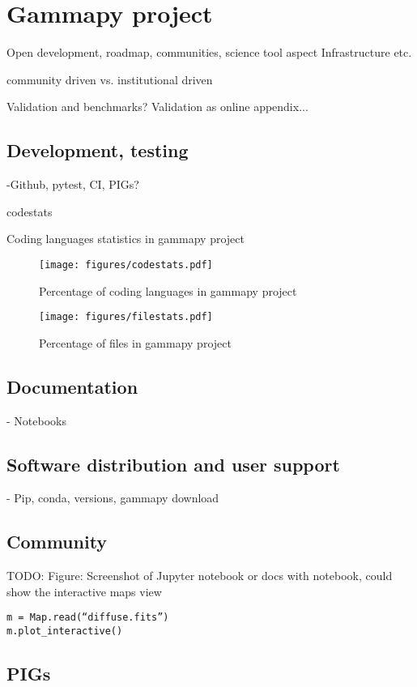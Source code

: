 \section{Gammapy project}
\label{sec:gammapy-project}

Open development, roadmap, communities, science tool aspect Infrastructure etc.

community driven vs. institutional driven

Validation and benchmarks? Validation as online appendix...

\subsection{Development, testing}
\label{ssec:development-testing}
-Github, pytest, CI, PIGs?

\begin{table}
	{codestats}
	\caption{Coding languages statistics in gammapy project}
	\label{table:codestats:data}
\end{table}

\begin{figure}[t]
	\centering
	\texttt{[image: figures/codestats.pdf]}
    \caption{
        Percentage of coding languages in gammapy project
    }
	\label{fig:codestats:lang}
\end{figure}

\begin{figure}[t]
	\centering
	\texttt{[image: figures/filestats.pdf]}
    \caption{
        Percentage of files in gammapy project
    }
	\label{fig:codestats:file}
\end{figure}

\subsection{Documentation}
\label{ssec:documentation}

- Notebooks

\subsection{Software distribution and user support}
\label{ssec:software-distribution-and-user-support}
- Pip, conda, versions, gammapy download

\subsection{Community}
\label{ssec:community}
TODO: Figure: Screenshot of Jupyter notebook or docs with notebook, could show
the interactive maps view
\begin{verbatim}
m = Map.read(“diffuse.fits”)
m.plot_interactive()
\end{verbatim}

\subsection{PIGs}
\label{ssec:pigs}
